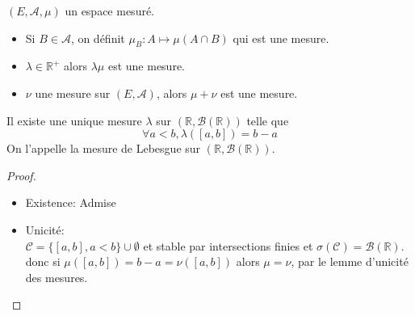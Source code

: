 \begin{prop}
	$(E, \mathscr{A}, \mu)$ un espace mesuré.
	\begin{itemize}
		\item Si $B \in \mathscr{A}$, on définit $\mu_B : A \mapsto \mu(A \cap B)$ qui est une mesure.
		\item $\lambda \in \mathbb{R}^+$ alors $\lambda \mu$ est une mesure.
		\item $\nu$ une mesure sur $(E, \mathscr{A})$, alors $\mu + \nu$ est une mesure.
	\end{itemize}
\end{prop}


\begin{theorem}
	Il existe une unique mesure $\lambda$ sur $(\mathbb{R}, \mathscr{B}(\mathbb{R}))$ telle que
	$$ \forall a < b, \lambda([a,b]) = b-a $$
	On l'appelle la mesure de Lebesgue sur $(\mathbb{R}, \mathscr{B}(\mathbb{R}))$.
\end{theorem}

\begin{proof}
	\begin{itemize}
		\item Existence: Admise
		\item Unicité: \\
		      $\mathscr{C} = \{ [a,b], a < b \} \cup \emptyset$ et stable par intersections finies et $\sigma (\mathscr{C}) = \mathscr{B}(\mathbb{R})$.
		      donc si $\mu([a,b]) = b-a = \nu([a,b])$ alors $\mu = \nu$, par le lemme d'unicité des mesures.
	\end{itemize}
\end{proof}
